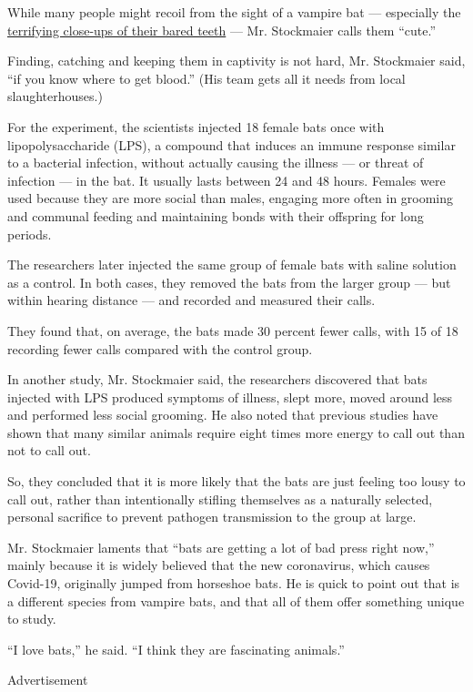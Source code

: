 While many people might recoil from the sight of a vampire bat ---
especially the
\href{https://www.nytimes3xbfgragh.onion/2016/11/01/science/fangs.html}{terrifying
close-ups of their bared teeth} --- Mr. Stockmaier calls them ``cute.''

Finding, catching and keeping them in captivity is not hard, Mr.
Stockmaier said, ``if you know where to get blood.'' (His team gets all
it needs from local slaughterhouses.)

For the experiment, the scientists injected 18 female bats once with
lipopolysaccharide (LPS), a compound that induces an immune response
similar to a bacterial infection, without actually causing the illness
--- or threat of infection --- in the bat. It usually lasts between 24
and 48 hours. Females were used because they are more social than males,
engaging more often in grooming and communal feeding and maintaining
bonds with their offspring for long periods.

The researchers later injected the same group of female bats with saline
solution as a control. In both cases, they removed the bats from the
larger group --- but within hearing distance --- and recorded and
measured their calls.

They found that, on average, the bats made 30 percent fewer calls, with
15 of 18 recording fewer calls compared with the control group.

In another study, Mr. Stockmaier said, the researchers discovered that
bats injected with LPS produced symptoms of illness, slept more, moved
around less and performed less social grooming. He also noted that
previous studies have shown that many similar animals require eight
times more energy to call out than not to call out.

So, they concluded that it is more likely that the bats are just feeling
too lousy to call out, rather than intentionally stifling themselves as
a naturally selected, personal sacrifice to prevent pathogen
transmission to the group at large.

Mr. Stockmaier laments that ``bats are getting a lot of bad press right
now,'' mainly because it is widely believed that the new coronavirus,
which causes Covid-19, originally jumped from horseshoe bats. He is
quick to point out that is a different species from vampire bats, and
that all of them offer something unique to study.

``I love bats,'' he said. ``I think they are fascinating animals.''

Advertisement

